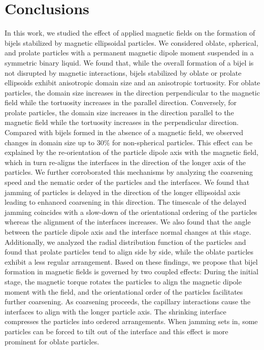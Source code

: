 \section{Conclusions}

In this work, we studied the effect of applied magnetic fields on the
formation of bijels stabilized by magnetic ellipsoidal particles. We
considered oblate, spherical, and prolate particles with a permanent
magnetic dipole moment suspended in a symmetric binary liquid. We found
that, while the overall formation of a bijel is not disrupted by
magnetic interactions, bijels stabilized by oblate or prolate ellipsoids
exhibit anisotropic domain size and an anisotropic tortuosity. For
oblate particles, the domain size increases in the direction
perpendicular to the magnetic field while the tortuosity increases in
the parallel direction. Conversely, for prolate particles, the domain
size increases in the direction parallel to the magnetic field while the
tortuosity increases in the perpendicular direction. Compared with
bijels formed in the absence of a magnetic field, we observed changes in
domain size up to \(30\%\) for non-spherical particles. This effect can
be explained by the re-orientation of the particle dipole axis with the
magnetic field, which in turn re-aligns the interfaces in the direction
of the longer axis of the particles. We further corroborated this
mechanisms by analyzing the coarsening speed and the nematic order of
the particles and the interfaces. We found that jamming of particles is
delayed in the direction of the longer ellipsoidal axis leading to
enhanced coarsening in this direction. The timescale of the delayed
jamming coincides with a slow-down of the orientational ordering of the
particles whereas the alignment of the interfaces increases. We also
found that the angle between the particle dipole axis and the interface
normal changes at this stage. Additionally, we analyzed the radial
distribution function of the particles and found that prolate particles
tend to align side by side, while the oblate particles exhibit a less
regular arrangement. Based on these findings, we propose that bijel
formation in magnetic fields is governed by two coupled effects: During
the initial stage, the magnetic torque rotates the particles to align
the magnetic dipole moment with the field, and the orientational order
of the particles facilitates further coarsening. As coarsening proceeds,
the capillary interactions cause the interfaces to align with the longer
particle axis. The shrinking interface compresses the particles into
ordered arrangements. When jamming sets in, some particles can be forced
to tilt out of the interface and this effect is more prominent for
oblate particles.

